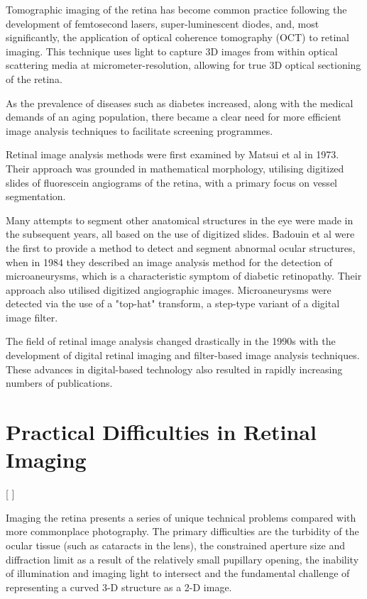 Tomographic imaging of the retina has become common practice following the development of femtosecond lasers, super-luminescent diodes, and, most significantly, the application of optical coherence tomography (OCT) to retinal imaging.\cite{huang1991optical} This technique uses light to capture 3D images from within optical scattering media at micrometer-resolution, allowing for true 3D optical sectioning of the retina.\cite{van2007recent}

As the prevalence of diseases such as diabetes increased, along with the medical demands of an aging population, there became a clear need for more efficient image analysis techniques to facilitate screening programmes.

Retinal image analysis methods were first examined by Matsui et al in 1973. Their approach was grounded in mathematical morphology, utilising digitized slides of fluorescein angiograms of the retina, with a primary focus on vessel segmentation.\cite{matsui1973study}

Many attempts to segment other anatomical structures in the eye were made in the subsequent years, all based on the use of digitized slides. Badouin et al were the first to provide a method to detect and segment abnormal ocular structures, when in 1984 they described an image analysis method for the detection of microaneurysms, which is a characteristic symptom of diabetic retinopathy.\cite{baudoin1983automatic} Their approach also utilised digitized angiographic images.  Microaneurysms were detected via the use of a "top-hat" transform, a step-type variant of a digital image filter.\cite{sonka1998image}  

The field of retinal image analysis changed drastically in the 1990s with the development of digital retinal imaging and filter-based image analysis techniques. These advances in digital-based technology also resulted in rapidly increasing numbers of publications.



\section{Practical Difficulties in Retinal Imaging}
[ ]


Imaging the retina presents a series of unique technical problems compared
with more commonplace photography. The primary difficulties are the turbidity
of the ocular tissue (such as cataracts in the lens), the constrained aperture
size and diffraction limit as a result of the relatively small pupillary opening, the inability of
illumination and imaging light to intersect and the fundamental challenge of
representing a curved 3-D structure as a 2-D image.

